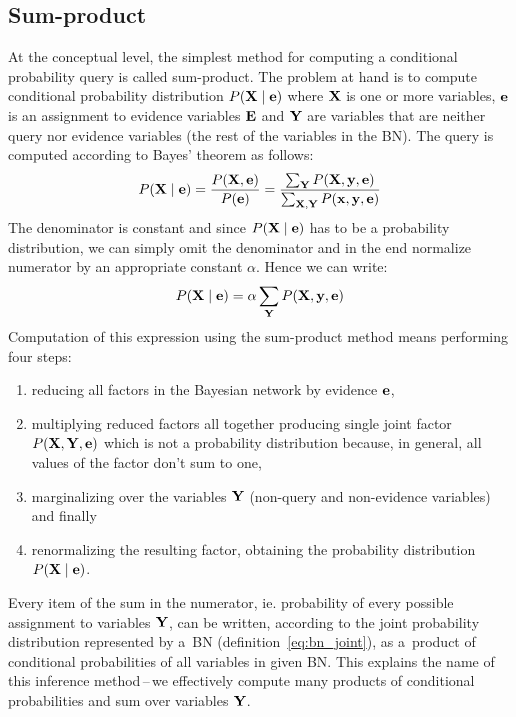 \documentclass[english,cover]{fitthesis} %
\newcommand{\vars}[1]{{\bold{#1}}}         %
\begin{document}
\subsection{Sum-product}
At the conceptual level, the simplest method for computing a conditional probability query is called sum-product. The problem at hand is to compute conditional probability distribution $P(\vars{X} \mid \vars{e})$ where $\vars{X}$ is one or more variables, $\vars{e}$ is an assignment to evidence variables $\vars{E}$ and $\vars{Y}$ are variables that are neither query nor evidence variables (the rest of the variables in the BN). The query is computed according to Bayes' theorem as follows:
\begin{equation*}
P(\vars{X} \mid \vars{e})
 = \frac{P(\vars{X}, \vars{e})} {P(\vars{e})}
 = \frac{\sum_\vars{Y} P(\vars{X}, \vars{y}, \vars{e})}{\sum_{\vars{X},\vars{Y}} P(\vars{x}, \vars{y}, \vars{e})}
\end{equation*}
The denominator is constant and since $P(\vars{X} \mid \vars{e})$ has to be a probability distribution, we can simply omit the denominator and in the end normalize numerator by an appropriate constant $\alpha$. Hence we can write:
\begin{equation*}
P(\vars{X} \mid \vars{e})
 = \alpha \sum_\vars{Y} P(\vars{X}, \vars{y}, \vars{e})
\end{equation*}
Computation of this expression using the sum-product method means performing four steps:
\begin{enumerate}
	\item reducing all factors in the Bayesian network by evidence $\vars{e}$,
	\item multiplying reduced factors all together producing single joint factor $P(\vars{X},\vars{Y},\vars{e})$ which is not a probability distribution because, in general, all values of the factor don't sum to one,
	\item marginalizing over the variables $\vars{Y}$ (non-query and non-evidence variables) and finally
	\item renormalizing the resulting factor, obtaining the probability distribution $P(\vars{X} \mid \vars{e})$.
\end{enumerate}

Every item of the sum in the numerator, ie. probability of every possible assignment to variables $\vars{Y}$, can be written, according to the joint probability distribution represented by a~BN (definition~\eqref{eq:bn_joint}), as a~product of conditional probabilities of all variables in given BN. This explains the name of this inference method\,--\,we effectively compute many products of conditional probabilities and sum over variables $\vars{Y}$.
\end{document}
